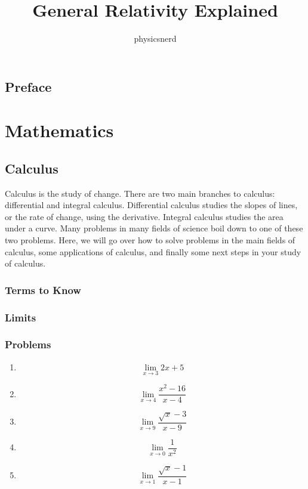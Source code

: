 \documentclass{memoir}
\title{General Relativity Explained}
\author{physicsnerd}
\begin{document}
\frontmatter
\maketitle
\tableofcontents
\chapter{Preface}

\mainmatter
\part{Mathematics}
\chapter{Calculus}
Calculus is the study of change. 
There are two main branches to calculus: differential and integral calculus. 
Differential calculus studies the slopes of lines, or the rate of change, using the derivative. 
Integral calculus studies the area under a curve. 
Many problems in many fields of science boil down to one of these two problems. 
Here, we will go over how to solve problems in the main fields of calculus, some applications of calculus, and finally some next steps in your study of calculus.

\section{Terms to Know}


\section{Limits}


\section{Problems}
\begin{enumerate}
    \item $$\lim\limits_{x\rightarrow 3} 2x+5$$
    \item $$\lim\limits_{x\rightarrow 4} \frac{x^2-16}{x-4}$$
    \item $$\lim\limits_{x\rightarrow 9} \frac{\sqrt{x}-3}{x-9}$$
    \item $$\lim\limits_{x\rightarrow 0} \frac{1}{x^2}$$
    \item $$\lim\limits_{x\rightarrow 1} \frac{\sqrt{x}-1}{x-1}$$
\end{enumerate}
\end{document}
